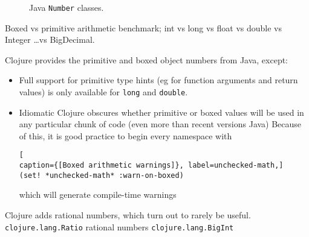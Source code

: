 
\begin{figure}[htbp]
\centering
\caption{Java \texttt{Number} classes.}
\label{fig:java-number-classes}
\end{figure}

Boxed vs primitive arithmetic benchmark; 
int vs long vs float vs double vs Integer \ldots vs BigDecimal.


\lstset{language=Clojure}

Clojure provides the primitive and boxed object numbers from Java,
except:
\begin{itemize}
  \item Full support for primitive type hints (eg for function arguments and
  return values) is only available for \lstinline|long| and \lstinline|double|.
  \item Idiomatic Clojure obscures whether primitive or boxed values will be
  used in any particular chunk of code (even more than recent versions  Java)
  Because of this, it is good practice to begin every namespace with
\begin{lstlisting}[
caption={[Boxed arithmetic warnings]}, label=unchecked-math,]  
(set! *unchecked-math* :warn-on-boxed)
\end{lstlisting}
which will generate compile-time warnings
\end{itemize}

Clojure adds rational numbers, which turn out to rarely be useful.\\
\lstinline|clojure.lang.Ratio| rational numbers
\lstinline|clojure.lang.BigInt|~\cite[p. 428]{EmerickCarperGrand:2012:ClojureProgramming}
